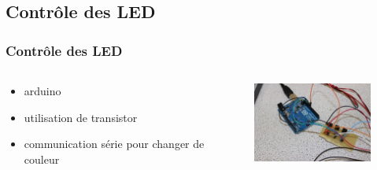 \subsection{Contrôle des LED}
\begin{frame}
  \frametitle{Contrôle des LED}
  \begin{columns}[c]
    \begin{column}[T]{0.5\textwidth}
      \begin{itemize}
        \item arduino
        \item utilisation de transistor
        \item communication série pour changer de couleur
      \end{itemize}
    \end{column}
    \begin{column}[T]{0.5\textwidth}
      \begin{figure}
        \includegraphics[width=5cm]{../img/arduino+transistorcard.JPG}
      \end{figure}
    \end{column}
  \end{columns}
\end{frame}
